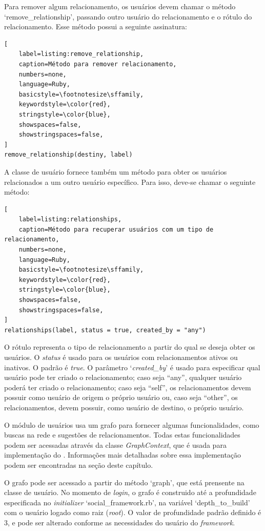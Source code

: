 Para remover algum relacionamento, os usuários devem chamar o método `remove\_relationship', passando outro usuário do relacionamento e o rótulo do relacionamento. Esse método possui a seguinte assinatura:

\begin{lstlisting}[
    label=listing:remove_relationship,
    caption=Método para remover relacionamento,
    numbers=none,
    language=Ruby,
    basicstyle=\footnotesize\sffamily,
    keywordstyle=\color{red},
    stringstyle=\color{blue},
    showspaces=false,
    showstringspaces=false,
]
remove_relationship(destiny, label)
\end{lstlisting}

A classe de usuário fornece também um método para obter os usuários relacionados a um outro usuário específico. Para isso, deve-se chamar o seguinte método:

\begin{lstlisting}[
    label=listing:relationships,
    caption=Método para recuperar usuários com um tipo de relacionamento,
    numbers=none,
    language=Ruby,
    basicstyle=\footnotesize\sffamily,
    keywordstyle=\color{red},
    stringstyle=\color{blue},
    showspaces=false,
    showstringspaces=false,
]
relationships(label, status = true, created_by = "any")
\end{lstlisting}

O rótulo representa o tipo de relacionamento a partir do qual se deseja obter os usuários. O \textit{status} é usado para os usuários com relacionamentos ativos ou inativos. O padrão é \textit{true}. O parâmetro `\textit{created\_by}' é usado para especificar qual usuário pode ter criado o relacionamento; caso seja ``any'', qualquer usuário poderá ter criado o relacionamento; caso seja ``self'', os relacionamentos devem possuir como usuário de origem o próprio usuário ou, caso seja ``other'', os relacionamentos, devem possuir, como usuário de destino, o próprio usuário.

O módulo de usuários usa um grafo para fornecer algumas funcionalidades, como buscas na rede e sugestões de relacionamentos. Todas estas funcionalidades podem ser acessadas através da classe \textit{GraphContext}, que é usada para implementação do . Informações mais detalhadas sobre essa implementação podem ser encontradas na seção  deste capítulo.

O grafo pode ser acessado a partir do método `graph', que está prensente na classe de usuário. No momento de \textit{login}, o grafo é construido até a profundidade especificada no \textit{initializer} `social\_framework.rb', na variável `depth\_to\_build' com o usuário logado como raiz (\textit{root}). O valor de profundidade padrão definido é 3, e pode ser alterado conforme as necessidades do usuário do \textit{framework}.

